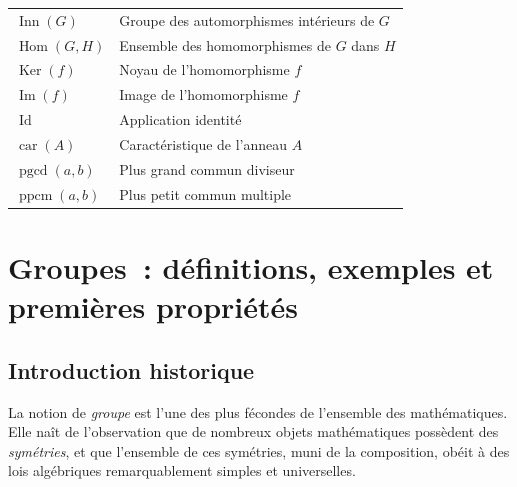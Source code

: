 \documentclass[12pt,a4paper,openany]{book}
\theoremstyle{definition}
\DeclareMathOperator{\Inn}{Inn}
\DeclareMathOperator{\Hom}{Hom}
\DeclareMathOperator{\Ker}{Ker}
\DeclareMathOperator{\Id}{Id}
\renewcommand{\Im}{\operatorname{Im}}
\DeclareMathOperator{\car}{car}
\DeclareMathOperator{\pgcd}{pgcd}
\DeclareMathOperator{\ppcm}{ppcm}
\begin{document}
\begin{tabular}{@{}ll@{}}
$\Inn(G)$ & Groupe des automorphismes intérieurs de $G$ \\
$\Hom(G,H)$ & Ensemble des homomorphismes de $G$ dans $H$ \\
$\Ker(f)$ & Noyau de l'homomorphisme $f$ \\
$\Im(f)$ & Image de l'homomorphisme $f$ \\
$\Id$ & Application identité \\
$\car(A)$ & Caractéristique de l'anneau $A$ \\
$\pgcd(a,b)$ & Plus grand commun diviseur \\
$\ppcm(a,b)$ & Plus petit commun multiple \\
\bottomrule
\end{tabular}



\chapter{Groupes~: définitions, exemples et premières propriétés}
\label{chap:groupes-definitions}

\section{Introduction historique}
\label{sec:ch1-intro-historique}

La notion de \emph{groupe} est l'une des plus fécondes de l'ensemble des
mathématiques. Elle naît de l'observation que de nombreux objets mathématiques possèdent
des \emph{symétries}, et que l'ensemble de ces symétries, muni de la composition, obéit
à des lois algébriques remarquablement simples et universelles.
\end{document}
